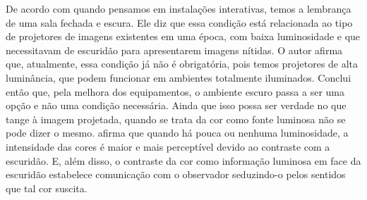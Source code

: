 De acordo com  quando pensamos em instalações interativas, temos a lembrança de uma sala fechada e escura. Ele diz que essa condição está relacionada ao tipo de projetores de imagens existentes em uma época, com baixa luminosidade e que necessitavam de escuridão para apresentarem imagens nítidas. O autor afirma que, atualmente, essa condição já não é obrigatória, pois temos projetores de alta luminância, que podem funcionar em ambientes totalmente iluminados. Conclui então que, pela melhora dos equipamentos, o ambiente escuro passa a ser uma opção e não uma condição necessária. Ainda que isso possa ser verdade no que tange à imagem projetada, quando se trata da cor como fonte luminosa não se pode dizer o mesmo.  afirma que quando há pouca ou nenhuma luminosidade, a intensidade das cores é maior e mais perceptível devido ao contraste com a escuridão. E, além disso, o contraste da cor como informação luminosa em face da escuridão estabelece comunicação com o observador seduzindo-o pelos sentidos que tal cor suscita.

